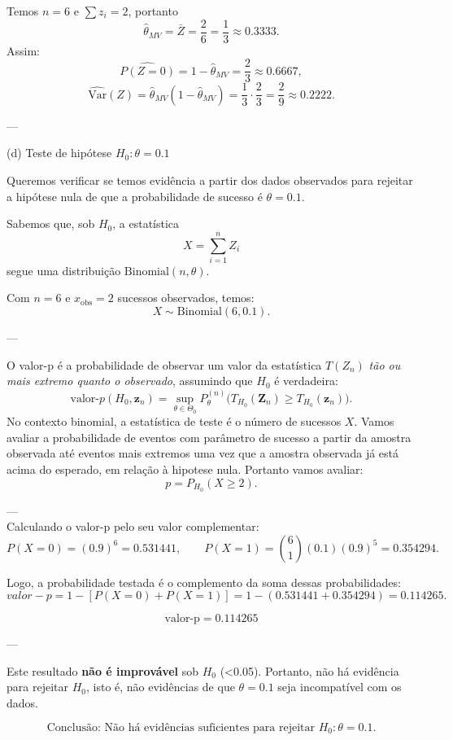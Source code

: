Temos \( n = 6 \) e \( \sum z_i = 2 \), portanto
\[
\hat{\theta}_{MV} = \bar{Z} = \frac{2}{6} = \frac{1}{3} \approx 0.3333.
\]
Assim:
\[
\widehat{P(Z=0)} = 1 - \hat{\theta}_{MV} = \frac{2}{3} \approx 0.6667,
\]
\[
\widehat{\mathrm{Var}}(Z) = \hat{\theta}_{MV}(1 - \hat{\theta}_{MV})
= \frac{1}{3} \cdot \frac{2}{3} = \frac{2}{9} \approx 0.2222.
\]

---

(d) Teste de hipótese \( H_0: \theta = 0.1 \)

Queremos verificar se temos evidência a partir dos dados observados para rejeitar a hipótese nula 
de que a probabilidade de sucesso é $\theta = 0.1$.

Sabemos que, sob $H_0$, a estatística
\[
X = \sum_{i=1}^{n} Z_i
\]
segue uma distribuição $\text{Binomial}(n, \theta)$.

Com $n = 6$ e $x_{\text{obs}} = 2$ sucessos observados, temos:
\[
X \sim \text{Binomial}(6, 0.1).
\]

---
 
O valor-p é a probabilidade de observar um valor da estatística $T(Z_n)$ 
\textit{tão ou mais extremo quanto o observado}, assumindo que $H_0$ é verdadeira:
\[
\boxed{
\text{valor-}p(H_0, \mathbf{z}_n)
= \sup_{\theta \in \Theta_0}
P^{(n)}_{\theta}\!\big(
T_{H_0}(\mathbf{Z}_n)
\ge
T_{H_0}(\mathbf{z}_n)
\big).
}
\]
No contexto binomial, a estatística de teste é o número de sucessos $X$. Vamos avaliar a probabilidade de eventos
com parâmetro de sucesso a partir da amostra observada até eventos mais extremos uma vez que a amostra observada já está acima do esperado, em relação à hipotese nula. Portanto vamos avaliar:
\[
p = P_{H_0}(X \ge 2).
\]

---
\\
Calculando o valor-p pelo seu valor complementar:
\[
P(X=0) = (0.9)^6 = 0.531441, \qquad 
P(X=1) = \binom{6}{1}(0.1)(0.9)^5 = 0.354294.
\]

Logo, a probabilidade testada é o complemento da soma dessas probabilidades:
\[
valor-p = 1 - [P(X=0) + P(X=1)] = 1 - (0.531441 + 0.354294) = 0.114265.
\]

\[
\boxed{\text{valor-p} = 0.114265}
\]

---

Este resultado \textbf{não é improvável} sob $H_0$ (<0.05).  
Portanto, não há evidência para rejeitar  $H_0$, isto é, não evidências de que $\theta = 0.1$ seja incompatível com os dados.

\[
\boxed{\text{Conclusão: Não há evidências suficientes para rejeitar } H_0 : \theta = 0.1.}
\]
